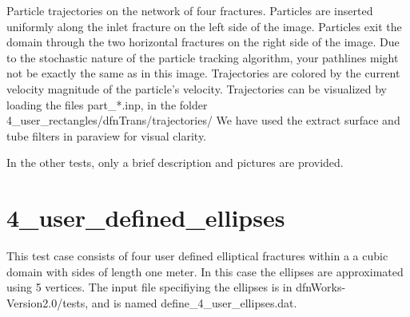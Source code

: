 \documentclass[letterpaper,10pt,english]{sphinxmanual}
\begin{document}
Particle trajectories on the network of four fractures.
Particles are inserted uniformly along the inlet fracture on the left side of the image.
Particles exit the domain through the two horizontal fractures on the right side of the image.
Due to the stochastic nature of the particle tracking algorithm, your pathlines might not be exactly the same as in this image.
Trajectories are colored by the current velocity magnitude of the particle's velocity.
Trajectories can be visualized by loading the files part\_*.inp, in the folder 4\_user\_rectangles/dfnTrans/trajectories/
We have used the extract surface and tube filters in paraview for visual clarity.

{\hfill{}\hfill}

In the other tests, only a brief description and pictures are provided.


\section{4\_user\_defined\_ellipses}
\label{examples:user-defined-ellipses}
This test case consists of four user defined elliptical fractures within a a cubic domain with sides of length one meter. In this case the ellipses are approximated using 5 vertices. The input file specifiying the ellipses is in dfnWorks-Version2.0/tests, and is named define\_4\_user\_ellipses.dat.

{\hfill{}\hfill}
\end{document}
